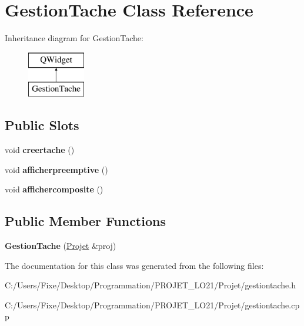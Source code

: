 \hypertarget{class_gestion_tache}{}\section{Gestion\+Tache Class Reference}
\label{class_gestion_tache}
Inheritance diagram for Gestion\+Tache\+:\begin{figure}[H]
\begin{center}
\leavevmode
\includegraphics[height=2.000000cm]{class_gestion_tache}
\end{center}
\end{figure}
\subsection*{Public Slots}
\begin{DoxyCompactItemize}
\item 
\hypertarget{class_gestion_tache_afaf0a96fcab8b0236c020ab8b8e0afac}{}void {\bfseries creertache} ()\label{class_gestion_tache_afaf0a96fcab8b0236c020ab8b8e0afac}

\item 
\hypertarget{class_gestion_tache_ac71549780c3792df223d1de854d41fbb}{}void {\bfseries afficherpreemptive} ()\label{class_gestion_tache_ac71549780c3792df223d1de854d41fbb}

\item 
\hypertarget{class_gestion_tache_afca85893d5d1e574d0f741123aeba627}{}void {\bfseries affichercomposite} ()\label{class_gestion_tache_afca85893d5d1e574d0f741123aeba627}

\end{DoxyCompactItemize}
\subsection*{Public Member Functions}
\begin{DoxyCompactItemize}
\item 
\hypertarget{class_gestion_tache_a36dbeb2ed92051c19db3dcb940b725b0}{}{\bfseries Gestion\+Tache} (\hyperlink{class_projet}{Projet} \&proj)\label{class_gestion_tache_a36dbeb2ed92051c19db3dcb940b725b0}

\end{DoxyCompactItemize}


The documentation for this class was generated from the following files\+:\begin{DoxyCompactItemize}
\item 
C\+:/\+Users/\+Fixe/\+Desktop/\+Programmation/\+P\+R\+O\+J\+E\+T\+\_\+\+L\+O21/\+Projet/gestiontache.\+h\item 
C\+:/\+Users/\+Fixe/\+Desktop/\+Programmation/\+P\+R\+O\+J\+E\+T\+\_\+\+L\+O21/\+Projet/gestiontache.\+cpp\end{DoxyCompactItemize}
